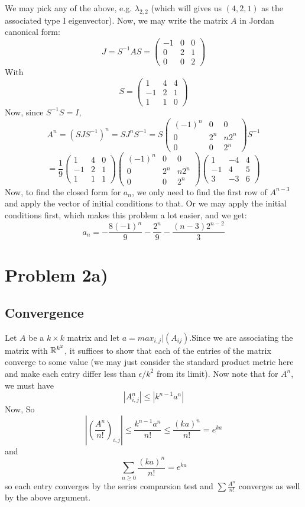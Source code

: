 We may pick any of the above, e.g. $\lambda_{2,2}$ (which will gives us $(4,2,1)$ as the associated type  I eigenvector).
Now, we may write the matrix $A$ in Jordan canonical form:
\[
J = S^{-1} A S = \begin{pmatrix}
-1&0&0\\
0&2&1\\
0&0&2
\end{pmatrix}
\]
With 
\[ S = \begin{pmatrix}
1&4&4\\-1&2&1\\1&1&0
\end{pmatrix}
\]
Now, since $S^{-1}S=I$,
\[ A^n = (SJS^{-1})^n = SJ^nS^{-1} = S\begin{pmatrix}
(-1)^n&0&0\\
0&2^n&n2^n\\
0&0&2^n
\end{pmatrix}
S^{-1}\]\[=\frac{1}{9}
\begin{pmatrix}
1&4&0\\-1&2&1\\1&1&1
\end{pmatrix}
\begin{pmatrix}
(-1)^n&0&0\\
0&2^n&n2^n\\
0&0&2^n
\end{pmatrix}
\begin{pmatrix}
1&-4&4\\
-1&4&5\\
3&-3&6
\end{pmatrix}
\]
Now, to find the closed form for $a_n$, we only need to find the first row of $A^{n-3}$ and apply the vector of initial conditions to that. Or we may apply the initial conditions first, which makes this problem a lot easier, and we get: 
\[ a_n = -\frac{8(-1)^n}{9} - \frac{2^n}{9} - \frac{(n-3)2^{n-2}}{3} \]
\section*{Problem 2a)}
\subsection*{Convergence}
Let $A$ be a $k\times k$ matrix and let $a=max_{i,j} |(A_{ij})$.Since we are associating the matrix with $\mathbb{R}^{k^2}$, it suffices to show that each of the entries of the matrix converge to some value (we may just consider the standard product metric here and make each entry differ less than $\epsilon/k^2$ from its limit). 
 Now note that for $A^n$, we must have
\[ |A^n_{i,j}| \leq |k^{n-1} a^n| \]
Now,
So
\[ \left|\left(\frac{A^n}{n!}\right)_{i,j}\right| \leq  \frac{k^{n-1} a^n}{n!}\leq  \frac{(ka)^n}{n!} = e^{ka} \]
and
\[\sum_{n\geq 0}  \frac{(ka)^n}{n!} = e^{ka} \]
so each entry converges by the series comparsion test and $\sum \frac{A^n}{n!}$ converges as well by the above argument.
